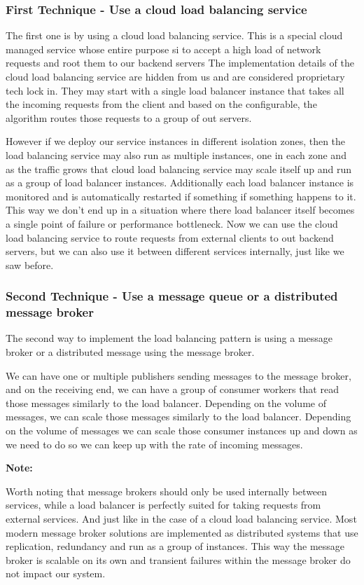 \documentclass[a4paper, 11pt]{book}
\newenvironment{note}{
    \begin{siderule}
        \textbf{Note: }
        }{
    \end{siderule}}
\begin{document}
    \subsubsection{First Technique - Use a cloud load balancing service}
    The first one is by using a cloud load balancing service.
    This is a special cloud managed service whose entire purpose si to accept a high load of network requests and root them to our backend servers
    The implementation details of the cloud load balancing service are hidden from us and are considered proprietary tech lock in.
    They may start with a single load balancer instance that takes all the incoming requests from the client and based on the configurable, the algorithm routes those requests to a group of out servers.

    However if we deploy our service instances in different isolation zones, then the load balancing service may also run as multiple instances, one in each zone and as the traffic grows that cloud load balancing service may scale itself up and run as a group of load balancer instances.
    Additionally each load balancer instance is monitored and is automatically restarted if something if something happens to it.
    This way we don't end up in a situation where there load balancer itself becomes a single point of failure or performance bottleneck.
    Now we can use the cloud load balancing service to route requests from external clients to out backend servers, but we can also use it between different services internally, just like we saw before.

    \subsubsection{Second Technique - Use a message queue or a distributed message broker}
    The second way to implement the load balancing pattern is using a message broker or a distributed message using the message broker.

    We can have one or multiple publishers sending messages to the message broker, and on the receiving end, we can have a group of consumer workers that read those messages similarly to the load balancer.
    Depending on the volume of messages, we can scale those messages similarly to the load balancer.
    Depending on the volume of messages we can scale those consumer instances up and down as we need to do so we can keep up with the rate of incoming messages.

    \begin{note}
        Worth noting that message brokers should only be used internally between services, while a load balancer is perfectly suited for taking requests from external services.
        And just like in the case of a cloud load balancing service.
        Most modern message broker solutions are implemented as distributed systems that use replication, redundancy and run as a group of instances.
        This way the message broker is scalable on its own and transient failures within the message broker do not impact our system.
    \end{note}
\end{document}
